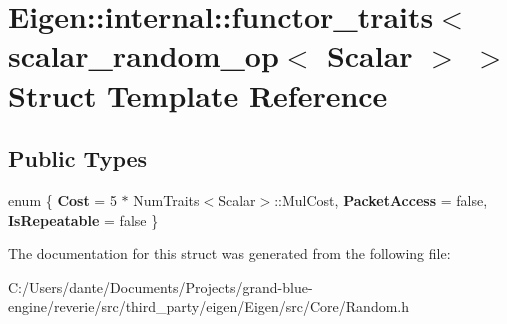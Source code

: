 \hypertarget{struct_eigen_1_1internal_1_1functor__traits_3_01scalar__random__op_3_01_scalar_01_4_01_4}{}\section{Eigen\+::internal\+::functor\+\_\+traits$<$ scalar\+\_\+random\+\_\+op$<$ Scalar $>$ $>$ Struct Template Reference}
\label{struct_eigen_1_1internal_1_1functor__traits_3_01scalar__random__op_3_01_scalar_01_4_01_4}
\subsection*{Public Types}
\begin{DoxyCompactItemize}
\item 
\mbox{\label{struct_eigen_1_1internal_1_1functor__traits_3_01scalar__random__op_3_01_scalar_01_4_01_4_a767b61983cc6c9d5177934bdf9dbe38b}} 
enum \{ {\bfseries Cost} = 5 $\ast$ Num\+Traits$<$Scalar$>$\+::Mul\+Cost, 
{\bfseries Packet\+Access} = false, 
{\bfseries Is\+Repeatable} = false
 \}
\end{DoxyCompactItemize}


The documentation for this struct was generated from the following file\+:\begin{DoxyCompactItemize}
\item 
C\+:/\+Users/dante/\+Documents/\+Projects/grand-\/blue-\/engine/reverie/src/third\+\_\+party/eigen/\+Eigen/src/\+Core/Random.\+h\end{DoxyCompactItemize}
